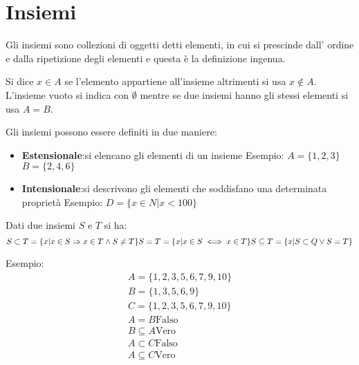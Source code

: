 \chapter{Insiemi}
Gli insiemi sono collezioni di oggetti detti elementi, in cui si prescinde dall'
ordine e dalla ripetizione degli elementi e questa è la definizione ingenua.

Si dice $x \in A$ se l'elemento appartiene all'insieme altrimenti si usa $x \not \in A$.
L'insieme vuoto si indica con $\emptyset$ mentre se due insiemi hanno gli stessi elementi si usa $A = B$.

Gli insiemi possono essere definiti in due maniere:
\begin{itemize}
  \item \textbf{Estensionale}:si elencano gli elementi di un insieme\newline
        Esempio:\newline
        $A = \{1,2,3\}$\newline
        $B = \{2,4,6\}$\newline
  \item \textbf{Intensionale}:si descrivono gli elementi che soddisfano una determinata proprietà\newline
        Esempio: \newline
        $D = \{x \in N | x < 100\}$
\end{itemize}

Dati due insiemi $S$ e $T$ si ha:
\begin{equation*}
  S \subset T = \{x | x \in S \Rightarrow x \in T \land S \not = T \} \\
  S = T  = \{x | x \in S \iff x \in T \} \\
  S \subseteq T = \{x | S \subset Q \lor S = T \}
\end{equation*}

Esempio:\newline
\begin{equation*}
\begin{split}
A = \{1,2,3,5,6,7,9,10 \} \\
B = \{1,3,5,6,9 \} \\
C = \{1,2,3,5,6,7,9,10 \} \\
A = B \text{Falso} \\
B \subseteq A \text{Vero} \\
A \subset C \text{Falso} \\
A \subseteq C \text{Vero} \\
\end{split}
\end{equation*}

